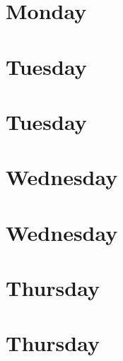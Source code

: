 \documentclass[12pt,a4paper,oneside,openany,extrafontsizes]{memoir}
\newcommand{\inputDay}[1]{
\hspace{-8mm}
    \scalebox{1}{}
}
\renewcommand{\bf}{\textbf}
\begin{document}
\frontmatter

\thispagestyle{empty}

\mainmatter
\setlength{\beforechapskip}{0mm}
\renewcommand*\hourheight{7.4em}
\renewcommand*\daywidth{23cm}
\renewcommand*\titlewidth{11cm}
\renewcommand*\sessionWidth{1.5cm}
\chapter*[Monday 17/9/2012\\QEST 2012 Workshops \& Tutorials]{Monday}
\inputDay{generated/qest0}%
\renewcommand*\titlewidth{19.8cm}
\chapter*[Tuesday 18/9/2012\\QEST]{Tuesday}
\inputDay{generated/qest1}%
\chapter*[Tuesday 18/9/2012\\FORMATS]{Tuesday}
\inputDay{generated/formats1}%
\chapter*[Wednesday 19/9/2012\\QEST]{Wednesday}
\inputDay{generated/qest2}%
\chapter*[Wednesday 19/9/2012\\FORMATS]{Wednesday}
\inputDay{generated/formats2}%
\chapter*[Thursday 20/9/2012\\QEST]{Thursday}
\inputDay{generated/qest3}%
\chapter*[Thursday 20/9/2012\\FORMATS]{Thursday}
\inputDay{generated/formats3}%
\end{document}
